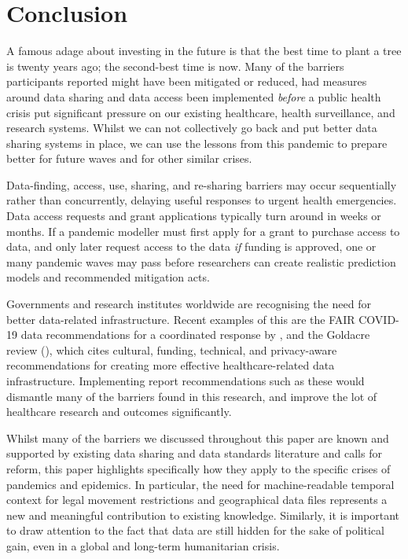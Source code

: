 \documentclass{CUP-JNL-DAP}%
\begin{document}
\section{Conclusion}
A famous adage about investing in the future is that the best time to plant a tree is twenty years ago; the second-best time is now. Many of the barriers participants reported might have been mitigated or reduced, had measures around data sharing and data access been implemented \textit{before} a public health crisis put significant pressure on our existing healthcare, health surveillance, and research systems. Whilst we can not collectively go back and put better data sharing systems in place, we can use the lessons from this pandemic to prepare better for future waves and for other similar crises. 

Data-finding, access, use, sharing, and re-sharing barriers may occur sequentially rather than concurrently, delaying useful responses to urgent health emergencies. Data access requests and grant applications typically turn around in weeks or months. If a pandemic modeller must first apply for a grant to purchase access to data, and only later request access to the data \textit{if} funding is approved, one or many pandemic waves may pass before researchers can create realistic prediction models and recommended mitigation acts. 

Governments and research institutes worldwide are recognising the need for better data-related infrastructure. Recent examples of this are the FAIR COVID-19 data recommendations for a coordinated response by \cite{FAIR_data_for_a_coordinated_COVID-19_response},  and the Goldacre review (\cite{goldacre_review}), which cites cultural, funding, technical, and privacy-aware recommendations for creating more effective healthcare-related data infrastructure. Implementing report recommendations such as these would dismantle many of the barriers found in this research, and improve the lot of healthcare research and outcomes significantly.

Whilst many of the barriers we discussed throughout this paper are known and supported by existing data sharing and data standards literature and calls for reform, this paper highlights specifically how they apply to the specific crises of pandemics and epidemics. In particular, the need for machine-readable temporal context for legal movement restrictions and geographical data files represents a new and meaningful contribution to existing knowledge. Similarly, it is important to draw attention to the fact that data are still hidden for the sake of political gain, even in a global and long-term humanitarian crisis. 
\end{document}
